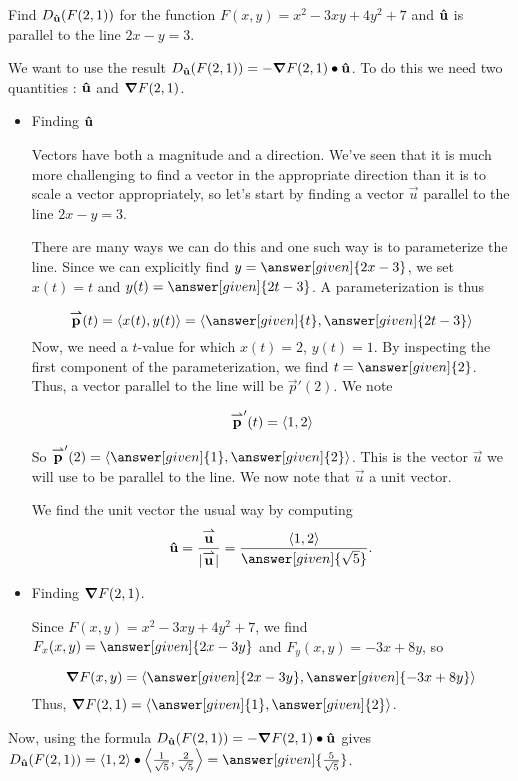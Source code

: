 \documentclass{ximera}
\begin{document}
\begin{example}
Find $D_{\mathbf{\hat{u}}}(F(2,1))$ for the function $F(x,y) = x^2-3xy+4y^2+7$ and $\mathbf{\hat{u}}$ is parallel to the line $2x-y=3$.

\begin{explanation}
We want to use the result $D_{\mathbf{\hat{u}}}(F(2,1)) =- \boldsymbol\nabla{F}(2,1) \bullet \mathbf{\hat{u}}$.  To do this we need two quantities : $\mathbf{\hat{u}}$ and $\boldsymbol\nabla{F}(2,1)$.

\begin{itemize}
\item Finding $\mathbf{\hat{u}}$

Vectors have both a magnitude and a direction.  We've seen that it is much more challenging to find a vector in the appropriate direction than it is to scale a vector appropriately, so let's start by finding a vector $\vec{u}$ parallel to the line $2x-y=3$.  

There are many ways we can do this and one such way is to parameterize the line.  Since we can explicitly find $y=\answer[given]{2x-3}$, we set $x(t)=t$ and $y(t) = \answer[given]{2t-3}$.  A parameterization is thus

\[
\vec{p}(t) = \vector{x(t),y(t)} = \vector{\answer[given]{t},\answer[given]{2t-3}}
\]
Now, we need a $t$-value for which $x(t) = 2$, $y(t)=1$.  By inspecting the first component of the parameterization, we find $t=\answer[given]{2}$.  Thus, a vector parallel to the line will be $\vec{p}'(2)$.  We note

\[
{\overset{\boldsymbol{\rightharpoonup}}{\mathbf{p}}}'(t) = \left\langle 1,2\right\rangle
\]

So $\vec{p}'(2) = \vector{\answer[given]{1},\answer[given]{2}}$.  This is the vector $\vec{u}$ we will use to be parallel to the line.  We now note that $\vec{u}$  a unit vector.  

We find the unit vector the usual way by computing 
\[
\uvec{u} = \frac{\vec{u}}{|\vec{u}|} = \frac{\vector{1,2}}{\answer[given]{\sqrt{5}}}.
\]

\item Finding $\boldsymbol\nabla{F}(2,1)$.

Since $F(x,y) = x^2-3xy+4y^2+7$, we find $F_x(x,y) = \answer[given]{2x-3y}$ and $F_y(x,y) = -3x+8y$, so 

\[
\grad{F}(x,y) = \vector{\answer[given]{2x-3y},\answer[given]{-3x+8y}}
\]
Thus, $\grad{F}(2,1) = \vector{\answer[given]{1},\answer[given]{2}}$.

\end{itemize}

Now, using the formula $D_{\mathbf{\hat{u}}}(F(2,1)) =- \boldsymbol\nabla{F}(2,1) \bullet \mathbf{\hat{u}}$ gives $D_{\uvec{u}}(F(2,1)) = \vector{1,2} \dotp \vector{\frac{1}{\sqrt{5}},\frac{2}{\sqrt{5}} } = \answer[given]{\frac{5}{\sqrt{5}}}$.

\end{explanation}
\end{example}
\end{document}
